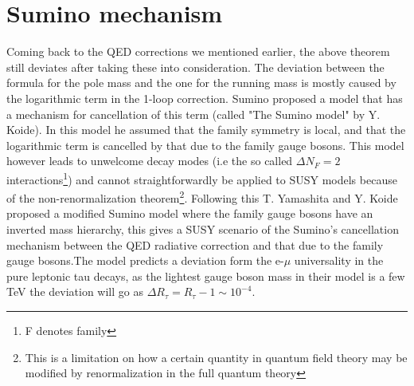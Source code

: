 \documentclass[twoside,twocolumn,11pt]{article} %
\begin{document}
\section{Sumino mechanism}
Coming back to the QED corrections we mentioned earlier, the above theorem still deviates after taking these into consideration. The deviation between the formula for the pole mass and the one for the running mass is mostly caused by the logarithmic term in the 1-loop correction. Sumino\cite{Sumino} proposed a model that has a mechanism for cancellation of this term (called "The Sumino model" by Y. Koide). In this model he assumed that the family symmetry is local, and that the logarithmic term is cancelled by that due to the family gauge bosons.
This model however leads to unwelcome decay modes (i.e the so called $\Delta N_F=2$ interactions\footnote{F denotes family}) and cannot straightforwardly be applied to
SUSY models because of the non-renormalization theorem\footnote{This is a limitation on how a certain quantity in quantum field theory may be modified by renormalization in the full quantum theory}. Following this T. Yamashita and Y. Koide proposed a modified Sumino model \cite{ModSumino} where the family gauge bosons have an inverted mass hierarchy, this gives a SUSY scenario of the Sumino’s cancellation mechanism between the QED radiative correction and that due to the family gauge bosons.The model predicts a deviation form the e-$\mu$ universality in the pure leptonic tau decays, as the lightest gauge boson mass in their model is a few TeV the deviation will go as $\Delta R_\tau = R_\tau - 1 \sim 10^{-4}$.
\end{document}
